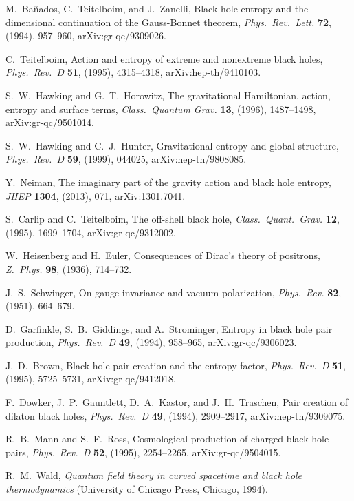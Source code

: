 \documentclass[11pt]{article}
\begin{document}
\begin{thebibliography}{999}
 M.\ Ba{\~n}ados, C.\ Teitelboim, and J.\ Zanelli, 
Black hole entropy and the dimensional continuation of the 
Gauss-Bonnet theorem, \emph{Phys.\ Rev.\ Lett.} {\bf 72},  
(1994), 957--960, arXiv:gr-qc/9309026.

 C.\ Teitelboim, Action and entropy of extreme 
and nonextreme black holes, \emph{Phys.\ Rev.\ D} {\bf 51}, (1995),  
4315--4318, arXiv:hep-th/9410103.

 S.~W.\ Hawking and G.~T.\ Horowitz,
The gravitational Hamiltonian, action, entropy and surface terms,
\emph{Class.\ Quantum Grav.} {\bf 13}, (1996), 1487--1498,
arXiv:gr-qc/9501014.

 S.~W.\ Hawking and C.\ J.\ Hunter, 
Gravitational entropy and global structure, \emph{Phys.\ Rev.\ D}
{\bf 59}, (1999), 044025, arXiv:hep-th/9808085.

 Y.\ Neiman, The imaginary part of the gravity 
action and black hole entropy, \emph{JHEP} {\bf 1304}, (2013), 
071, arXiv:1301.7041.

 S.\ Carlip and C.\ Teitelboim, The off-shell black 
hole, \emph{Class.\ Quant.\ Grav.} {\bf 12}, (1995), 1699--1704,
arXiv:gr-qc/9312002.

 W.\ Heisenberg and H.\ Euler, Consequences 
of Dirac's theory of positrons, \emph{Z.\ Phys.} {\bf 98}, (1936), 
714--732.

 J.~S.\ Schwinger, On gauge invariance and 
vacuum polarization, \emph{Phys.\ Rev.} {\bf 82}, (1951), 664--679.

 D.\ Garfinkle, S.\ B.\ Giddings, and A.\ Strominger,
Entropy in black hole pair production, \emph{Phys.\ Rev.\ D} {\bf 49}, 
(1994), 958--965, arXiv:gr-qc/9306023.

 J.~D.\ Brown, Black hole pair creation and the entropy 
factor, \emph{Phys.\ Rev.\ D} {\bf 51}, (1995), 5725--5731, 
arXiv:gr-qc/9412018.

 F.\ Dowker, J.~P.\ Gauntlett, D.~A.\ Kastor, and
J.~H.\ Traschen, Pair creation of dilaton black holes, \emph{Phys.\
Rev.\ D} {\bf 49}, (1994), 2909--2917, arXiv:hep-th/9309075.

 R.~B.\ Mann and S.~F.\ Ross, Cosmological 
production of charged black hole pairs, \emph{Phys.\ Rev.\ D}
{\bf 52}, (1995), 2254--2265, arXiv:gr-qc/9504015.

 R.~M.\ Wald, \emph{Quantum field theory in
curved spacetime and black hole thermodynamics} (University of
Chicago Press, Chicago, 1994).


\end{thebibliography}
\end{document}
